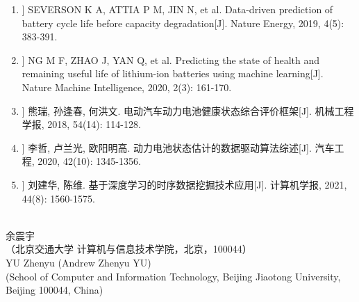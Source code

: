 \documentclass[a4paper,10.5pt]{article}
\begin{document}
\songti
\begin{enumerate}
    \itemsep=-2pt
    \item[[1]] SEVERSON K A, ATTIA P M, JIN N, et al. Data-driven prediction of battery cycle life before capacity degradation[J]. Nature Energy, 2019, 4(5): 383-391.
    \item[[2]] NG M F, ZHAO J, YAN Q, et al. Predicting the state of health and remaining useful life of lithium-ion batteries using machine learning[J]. Nature Machine Intelligence, 2020, 2(3): 161-170.
    \item[[3]] 熊瑞, 孙逢春, 何洪文. 电动汽车动力电池健康状态综合评价框架[J]. 机械工程学报, 2018, 54(14): 114-128.
    \item[[4]] 李哲, 卢兰光, 欧阳明高. 动力电池状态估计的数据驱动算法综述[J]. 汽车工程, 2020, 42(10): 1345-1356.
    \item[[5]] 刘建华, 陈维. 基于深度学习的时序数据挖掘技术应用[J]. 计算机学报, 2021, 44(8): 1560-1575.
\end{enumerate}

\newpage
{}\\[5pt]
余震宇\\[5pt]
（北京交通大学 计算机与信息技术学院，北京，100044）\\[15pt]
YU Zhenyu (Andrew Zhenyu YU)\\[5pt]
(School of Computer and Information Technology, Beijing Jiaotong University, Beijing 100044, China)
\end{document}
